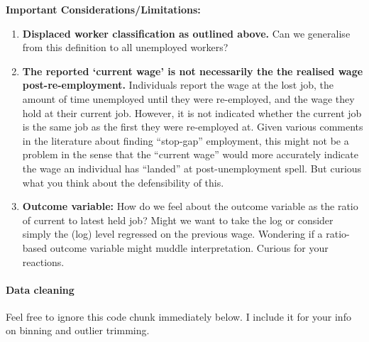 \textbf{Important Considerations/Limitations:}

\begin{enumerate}
\def\labelenumi{\arabic{enumi}.}
\tightlist
\item
  \textbf{Displaced worker classification as outlined above.} Can we
  generalise from this definition to all unemployed workers?
\item
  \textbf{The reported `current wage' is not necessarily the the
  realised wage post-re-employment.} Individuals report the wage at the
  lost job, the amount of time unemployed until they were re-employed,
  and the wage they hold at their current job. However, it is not
  indicated whether the current job is the same job as the first they
  were re-employed at. Given various comments in the literature about
  finding ``stop-gap'' employment, this might not be a problem in the
  sense that the ``current wage'' would more accurately indicate the
  wage an individual has ``landed'' at post-unemployment spell. But
  curious what you think about the defensibility of this.
\item
  \textbf{Outcome variable:} How do we feel about the outcome variable
  as the ratio of current to latest held job? Might we want to take the
  log or consider simply the (log) level regressed on the previous wage.
  Wondering if a ratio-based outcome variable might muddle
  interpretation. Curious for your reactions.
\end{enumerate}

\paragraph{Data cleaning}\label{data-cleaning}

Feel free to ignore this code chunk immediately below. I include it for
your info on binning and outlier trimming.

